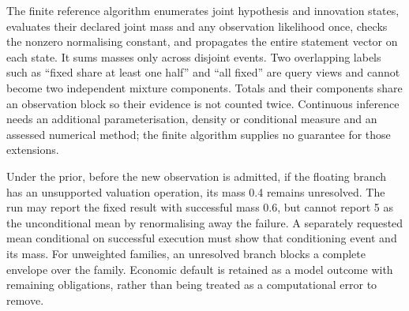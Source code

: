 The finite reference algorithm enumerates joint hypothesis and innovation
states, evaluates their declared joint mass and any observation likelihood
once, checks the nonzero normalising constant, and propagates the entire
statement vector on each state. It sums masses only across disjoint events.
Two overlapping labels such as ``fixed share at least one half'' and ``all
fixed'' are query views and cannot become two independent mixture components.
Totals and their components share an observation block so their evidence is
not counted twice. Continuous inference needs an additional parameterisation,
density or conditional measure and an assessed numerical method; the finite
algorithm supplies no guarantee for those extensions.

Under the prior, before the new observation is admitted, if the floating branch
has an unsupported valuation operation, its mass 0.4
remains unresolved. The run may report the fixed result with successful mass
0.6, but cannot report 5 as the unconditional mean by renormalising away the
failure. A separately requested mean conditional on successful execution must
show that conditioning event and its mass. For unweighted families, an
unresolved branch blocks a complete envelope over the family. Economic default
is retained as a model outcome with remaining obligations, rather than being
treated as a computational error to remove.


